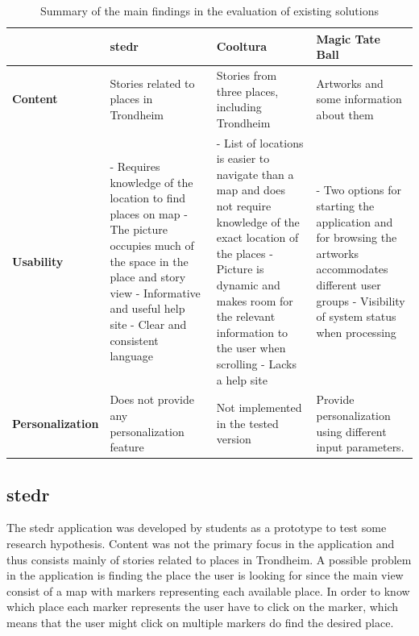 \begin{table}[t]
	\caption{Summary of the main findings in the evaluation of existing solutions}
	\begin{tabular}[b]{ | p{2.7cm} | >{\raggedright}p{4.3cm} | >{\raggedright}p{4.3cm} | p{4.3cm} |}
		\hline
		\textbf{} & \textbf{stedr} & \textbf{Cooltura} & \textbf{Magic Tate Ball} \\ \hline
		\textbf{Content} & Stories related to places in Trondheim & Stories from three places, including Trondheim & Artworks and some information about them \\ \hline
		\textbf{Usability} & 
			- Requires knowledge of the location to find places on map \newline
			- The picture occupies much of the space in the place and story view \newline
			- Informative and useful help site\newline
			- Clear and consistent language 
			& 
			- List of locations is easier to navigate than a map and does not require knowledge of the exact location of the places\newline
			- Picture is dynamic and makes room for the relevant information to the user when scrolling \newline
			- Lacks a help site
			&  
			- Two options for starting the application and for browsing the artworks accommodates different user groups \newline
			- Visibility of system status when processing 
			 \\ \hline
		\textbf{Personalization} & Does not provide any personalization feature & Not implemented in the tested version & Provide personalization using different input parameters.  \\ \hline
	\end{tabular}
	\label{Tab:existing_solutions}
\end{table}

\subsection{stedr}
\label{subsec:stedr}

The stedr application was developed by students as a prototype to test some research hypothesis. Content was not the primary focus in the application and thus consists mainly of stories related to places in Trondheim. A possible problem in the application is finding the place the user is looking for since the main view consist of a map with markers representing each available place. In order to know which place each marker represents the user have to click on the marker, which means that the user might click on multiple markers do find the desired place. \newline 

